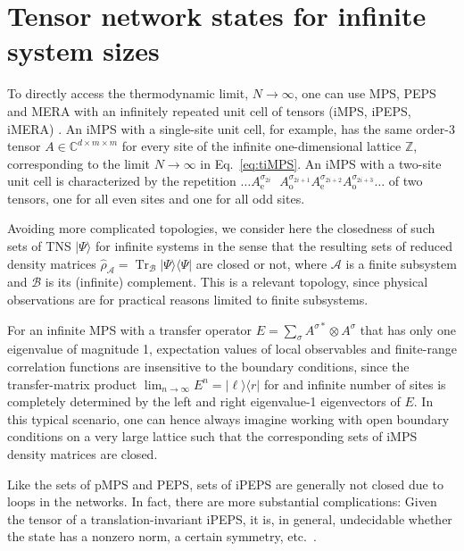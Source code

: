\documentclass[english,11pt,aps,pra,onecolumn,tightenlines,groupedaddress,superscriptaddress,notitlepage,floatfix,fleqn]{revtex4-1}
\newcommand{\bra}{\langle}
\newcommand{\ket}{\rangle}
\newcommand{\Tr}{\operatorname{Tr}}
\newcommand{\dm}{{\hat{\rho}}}
\newcommand{\s}{\sigma}
\newcommand{\ZZ}{\mathbb{Z}}
\newcommand{\CC}{\mathbb{C}}
\newcommand{\mc}[1]{\mathcal{#1}}
\newcommand{\A}{\mc{A}}
\newcommand{\B}{\mc{B}}
\begin{document}
\section{Tensor network states for infinite system sizes}\label{sec:infiniteTNS}
To directly access the thermodynamic limit, $N\to\infty$, one can use MPS, PEPS and MERA with an infinitely repeated unit cell of tensors (iMPS, iPEPS, iMERA) \cite{Vidal2007-98,Orus2008-78,McCulloch2008_04,Zauner2018-97,Jordan2008-101,Orus2009_05,Evenbly2009-79,Montangero2008-10}. An iMPS with a single-site unit cell, for example, has the same order-3 tensor $A\in \CC^{d\times m\times m}$ for every site of the infinite one-dimensional lattice $\ZZ$, corresponding to the limit $N\to\infty$ in Eq.~\eqref{eq:tiMPS}. An iMPS with a two-site unit cell is characterized by the repetition  $\dots A^{\s_{2i\phantom{+}}}_\text{e}\!\!\! A^{\s_{2i+1}}_\text{o} A^{\s_{2i+2}}_\text{e} A^{\s_{2i+3}}_\text{o} \dots$ of two tensors, one for all even sites and one for all odd sites.

Avoiding more complicated topologies, we consider here the closedness of such sets of TNS $|\Psi\ket$ for infinite systems in the sense that the resulting sets of reduced density matrices $\dm_\A=\Tr_\B|\Psi\ket\bra\Psi|$ are closed or not, where $\A$ is a finite subsystem and $\B$ is its (infinite) complement. This is a relevant topology, since physical observations are for practical reasons limited to finite subsystems.

For an infinite MPS with a transfer operator $E=\sum_\s A^{\s *} \otimes A^\s$ that has only one eigenvalue of magnitude 1, expectation values of local observables and finite-range correlation functions are insensitive to the boundary conditions, since the transfer-matrix product $\lim_{n\to\infty} E^n=|\ell\ket\bra r|$ for and infinite number of sites is completely determined by the left and right eigenvalue-1 eigenvectors of $E$. In this typical scenario, one can hence always imagine working with open boundary conditions on a very large lattice such that the corresponding sets of iMPS density matrices are closed.

Like the sets of pMPS and PEPS, sets of iPEPS are generally not closed due to loops in the networks. In fact, there are more substantial complications: Given the tensor of a translation-invariant iPEPS, it is, in general, undecidable whether the state has a nonzero norm, a certain symmetry, etc.\ \cite{Scarpa2020-125}.
\end{document}
